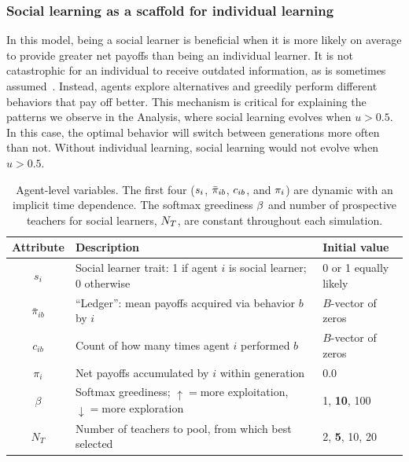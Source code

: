 \documentclass[letterpaper,11.5pt]{scrartcl}
\begin{document}
\subsubsection{Social learning as a scaffold for individual learning}

In this model, being a social learner is beneficial when it is more likely on
average to provide greater net payoffs than being an individual learner.  It is not
catastrophic for an individual to receive outdated information, as is sometimes
assumed~\cite[e.g.]{Rogers1988}. Instead, agents explore alternatives and
greedily perform different behaviors that pay off better. 
This mechanism is critical for explaining the patterns we observe in the 
Analysis, where social learning evolves when $u > 0.5$.
In this case, the optimal behavior will switch between generations more often than
not. Without individual learning, social learning would not evolve when $u > 0.5$.

\begin{table}[h]
  \vspace{2em}
  \caption{Agent-level variables. The first four ($\protect s_i$, $\protect
    \bar\pi_{ib}$, $\protect c_{ib}$,
  and $\protect \pi_i$) are dynamic with an implicit time dependence. The softmax
greediness $\protect \beta$ and number of prospective teachers for social learners,
$\protect N_T$, are constant throughout each simulation.}
    \label{tab:modelParameters}
    \centering %
    \begin{tabular}{cp{4.0in}p{1.25in}} \toprule

        Attribute & Description & Initial value \\ 

        \midrule  

        $s_i$  & Social learner trait: 1 if agent $i$ is social learner; 0 otherwise & 0
        or 1 equally likely \\

        $\bar\pi_{ib}$ & ``Ledger'': mean payoffs acquired via behavior $b$ by $i$ 
                       & $B$-vector of zeros \\

        $c_{ib}$ & Count of how many times agent $i$ performed $b$ 
              & $B$-vector of zeros \\

        $\pi_i$ & Net payoffs accumulated by $i$ within generation & 0.0 \\

        $\beta$ & Softmax greediness; $\uparrow=$more exploitation, $\downarrow=$more
                    exploration 
               & 1, \textbf{10}, 100 \\
        
        $N_T$    & Number of teachers to pool, from which best selected 
                 & 2, \textbf{5}, 10, 20  \\

        \bottomrule
    \end{tabular}
\end{table}
\end{document}

